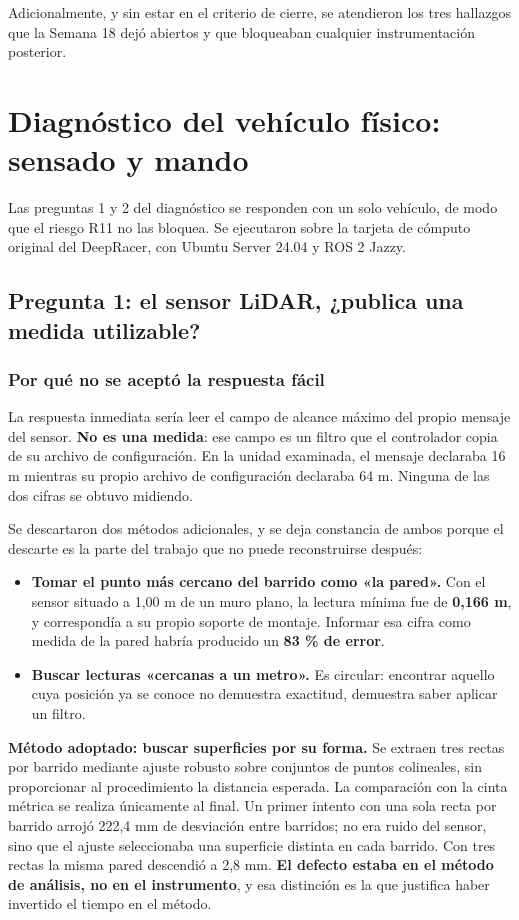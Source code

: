 \documentclass[12pt,letterpaper]{article}
\begin{document}
Adicionalmente, y sin estar en el criterio de cierre, se atendieron los tres hallazgos que la Semana 18 dejó abiertos y que bloqueaban cualquier instrumentación posterior.

\section{Diagnóstico del vehículo físico: sensado y mando}
\label{sec:hardware}

Las preguntas 1 y 2 del diagnóstico se responden con un solo vehículo, de modo que el riesgo R11 no las bloquea. Se ejecutaron sobre la tarjeta de cómputo original del DeepRacer, con Ubuntu Server 24.04 y ROS 2 Jazzy.

\subsection{Pregunta 1: el sensor LiDAR, ¿publica una medida utilizable?}

\subsubsection{Por qué no se aceptó la respuesta fácil}

La respuesta inmediata sería leer el campo de alcance máximo del propio mensaje del sensor. \textbf{No es una medida}: ese campo es un filtro que el controlador copia de su archivo de configuración. En la unidad examinada, el mensaje declaraba 16 m mientras su propio archivo de configuración declaraba 64 m. Ninguna de las dos cifras se obtuvo midiendo.

Se descartaron dos métodos adicionales, y se deja constancia de ambos porque el descarte es la parte del trabajo que no puede reconstruirse después:

\begin{itemize}
    \item \textbf{Tomar el punto más cercano del barrido como «la pared».} Con el sensor situado a 1,00 m de un muro plano, la lectura mínima fue de \textbf{0,166 m}, y correspondía a su propio soporte de montaje. Informar esa cifra como medida de la pared habría producido un \textbf{83 \% de error}.
    \item \textbf{Buscar lecturas «cercanas a un metro».} Es circular: encontrar aquello cuya posición ya se conoce no demuestra exactitud, demuestra saber aplicar un filtro.
\end{itemize}

\textbf{Método adoptado: buscar superficies por su forma.} Se extraen tres rectas por barrido mediante ajuste robusto sobre conjuntos de puntos colineales, sin proporcionar al procedimiento la distancia esperada. La comparación con la cinta métrica se realiza únicamente al final. Un primer intento con una sola recta por barrido arrojó 222,4 mm de desviación entre barridos; no era ruido del sensor, sino que el ajuste seleccionaba una superficie distinta en cada barrido. Con tres rectas la misma pared descendió a 2,8 mm. \textbf{El defecto estaba en el método de análisis, no en el instrumento}, y esa distinción es la que justifica haber invertido el tiempo en el método.
\end{document}
